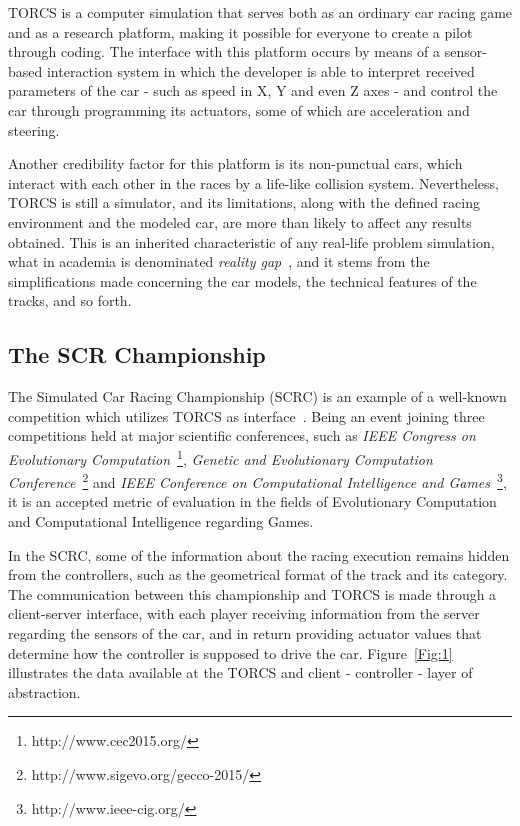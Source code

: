 	TORCS is a computer simulation that serves both as an ordinary car racing game and as a research platform, making it possible for everyone to create a pilot through coding. The interface with this platform occurs by means of a sensor-based interaction system in which the developer is able to interpret received parameters of the car - such as speed in X, Y and even Z axes - and control the car through programming its actuators, some of which are acceleration and steering.
	
	Another credibility factor for this platform is its non-punctual cars, which interact with each other in the races by a life-like collision system. Nevertheless, TORCS is still a simulator, and its limitations, along with the defined racing environment and the modeled car, are more than likely to affect any results obtained. This is an inherited characteristic of any real-life problem simulation, what in academia is denominated \emph{reality gap}~\cite{RG}, and it stems from the simplifications made concerning the car models, the technical features of the tracks, and so forth.

\subsection{The SCR Championship} \label{subsec:SCRC}

	The Simulated Car Racing Championship (SCRC) is an example of a well-known competition which utilizes TORCS as interface~\cite{SCR}. Being an event joining three competitions held at major scientific conferences, such as \emph{IEEE Congress on Evolutionary Computation}~\footnote{http://www.cec2015.org/}, \emph{Genetic and Evolutionary Computation Conference}~\footnote{http://www.sigevo.org/gecco-2015/} and \emph{IEEE Conference on Computational Intelligence and Games}~\footnote{http://www.ieee-cig.org/}, it is an accepted metric of evaluation in the fields of Evolutionary Computation and Computational Intelligence regarding Games.
	
	In the SCRC, some of the information about the racing execution remains hidden from the controllers, such as the geometrical format of the track and its category. The communication between this championship and TORCS is made through a client-server interface, with each player receiving information from the server regarding the sensors of the car, and in return providing actuator values that determine how the controller is supposed to drive the car. Figure~\ref{Fig:1} illustrates the data available at the TORCS and client - controller - layer of abstraction.


